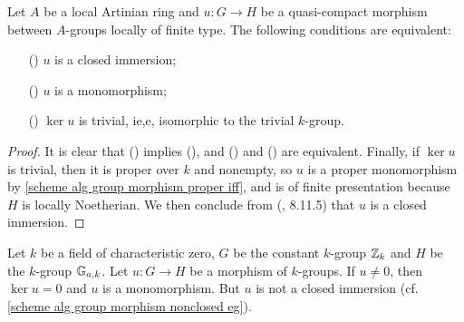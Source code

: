 \begin{corollary}\label{scheme alg group qc morphism monomorphism iff}
Let $A$ be a local Artinian ring and $u:G\to H$ be a quasi-compact morphism between $A$-groups locally of finite type. The following conditions are equivalent:
\begin{enumerate}
    \item[(\rmnum{1})] $u$ is a closed immersion;
    \item[(\rmnum{2})] $u$ is a monomorphism;
    \item[(\rmnum{3})] $\ker u$ is trivial, ie,e, isomorphic to the trivial $k$-group.
\end{enumerate}
\end{corollary}
\begin{proof}
It is clear that () implies (), and () and () are equivalent. Finally, if $\ker u$ is trivial, then it is proper over $k$ and nonempty, so $u$ is a proper monomorphism by \cref{scheme alg group morphism proper iff}, and is of finite presentation because $H$ is locally Noetherian. We then conclude from (\cite{EGA4-3}, 8.11.5) that $u$ is a closed immersion.
\end{proof}

\begin{example}\label{scheme k-group monomorphism nonclosed eg}
Let $k$ be a field of characteristic zero, $G$ be the constant $k$-group $\mathbb{Z}_k$ and $H$ be the $k$-group $\mathbb{G}_{a,k}$. Let $u:G\to H$ be a morphism of $k$-groups. If $u\neq 0$, then $\ker u=0$ and $u$ is a monomorphism. But $u$ is not a closed immersion (cf. \cref{scheme alg group morphism nonclosed eg}).
\end{example}


